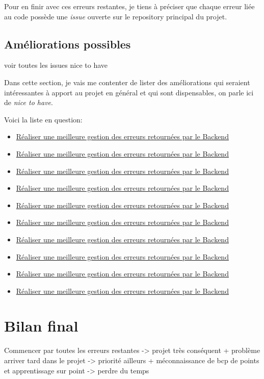 \documentclass[
    iai, %
    il, %
]{heig-tb}
\begin{document}
Pour en finir avec ces erreurs restantes, je tiens à préciser que chaque erreur liée au code possède une \emph{issue} ouverte sur le \Gls{repository} principal du projet.

\subsection{Améliorations possibles}
voir toutes les issues nice to have

Dans cette section, je vais me contenter de lister des améliorations qui seraient intéressantes à apport au projet en général et qui sont dispensables, on parle ici de \emph{nice to have}.

Voici la liste en question:
\begin{itemize}
    \item \href{}{Réaliser une meilleure gestion des erreurs retournées par le Backend}
    \item \href{}{Réaliser une meilleure gestion des erreurs retournées par le Backend}
    \item \href{}{Réaliser une meilleure gestion des erreurs retournées par le Backend}
    \item \href{}{Réaliser une meilleure gestion des erreurs retournées par le Backend}
    \item \href{}{Réaliser une meilleure gestion des erreurs retournées par le Backend}
    \item \href{}{Réaliser une meilleure gestion des erreurs retournées par le Backend}
    \item \href{}{Réaliser une meilleure gestion des erreurs retournées par le Backend}
    \item \href{}{Réaliser une meilleure gestion des erreurs retournées par le Backend}
    \item \href{}{Réaliser une meilleure gestion des erreurs retournées par le Backend}
    \item \href{}{Réaliser une meilleure gestion des erreurs retournées par le Backend}
\end{itemize}


\section{Bilan final}

Commencer par toutes les erreurs restantes -> projet très conséquent + problème arriver tard dans le projet -> priorité ailleurs + méconnaissance de bcp de points et apprentissage sur point -> perdre du temps
\end{document}
